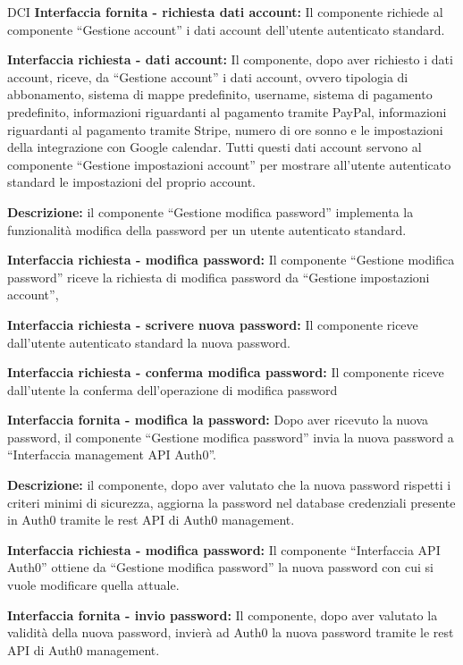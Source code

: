 \begin{listaPersonale}{DCI}
    \textbf{Interfaccia fornita - richiesta dati account:} Il componente richiede al componente “Gestione account” i dati account dell'utente autenticato standard.

    \textbf{Interfaccia richiesta - dati account:} Il componente, dopo aver richiesto i dati account, riceve, da “Gestione account” i dati account, ovvero tipologia di abbonamento, sistema di mappe predefinito, username, sistema di pagamento predefinito, informazioni riguardanti al pagamento tramite PayPal, informazioni riguardanti al pagamento tramite Stripe, numero di ore sonno e le impostazioni della integrazione con Google calendar. Tutti questi dati account servono al componente “Gestione impostazioni account” per mostrare all'utente autenticato standard le impostazioni del proprio account.



    \textbf{Descrizione:} il componente “Gestione modifica password” implementa la funzionalità modifica della password per un utente autenticato standard.

    \textbf{Interfaccia richiesta - modifica password:} Il componente “Gestione modifica password” riceve la richiesta di modifica password da “Gestione impostazioni account”,

    \textbf{Interfaccia richiesta - scrivere nuova password:} Il componente riceve dall'utente autenticato standard la nuova password.

    \textbf{Interfaccia richiesta - conferma modifica password:} Il componente riceve dall'utente la conferma dell'operazione di modifica password

    \textbf{Interfaccia fornita - modifica la password:} Dopo aver ricevuto la nuova password, il componente “Gestione modifica password” invia la nuova password a “Interfaccia management API Auth0”.



    \textbf{Descrizione:} il componente, dopo aver valutato che la nuova password rispetti i criteri minimi di sicurezza, aggiorna la password nel database credenziali presente in Auth0 tramite le rest API di Auth0 management.

    \textbf{Interfaccia richiesta - modifica password:} Il componente “Interfaccia API Auth0” ottiene da “Gestione modifica password” la nuova password con cui si vuole modificare quella attuale.

    \textbf{Interfaccia fornita - invio password:} Il componente, dopo aver valutato la validità della nuova password, invierà ad Auth0 la nuova password tramite le rest API di Auth0 management.



\end{listaPersonale}
